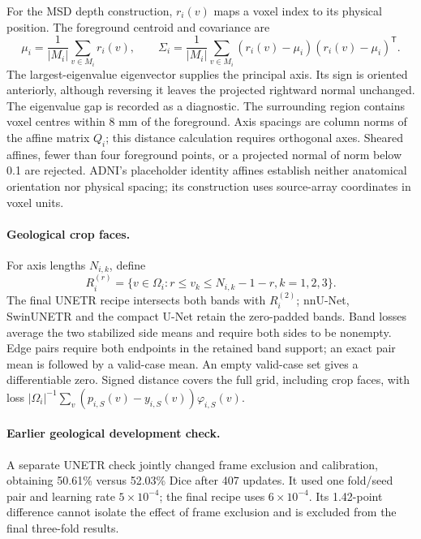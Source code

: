 For the MSD depth construction, $r_i(v)$ maps a voxel index to its
physical position. The foreground centroid and covariance are
\begin{equation}
\mu_i=\frac{1}{|M_i|}\sum_{v\in M_i}r_i(v),\qquad
\Sigma_i=\frac{1}{|M_i|}\sum_{v\in M_i}
(r_i(v)-\mu_i)(r_i(v)-\mu_i)^{\mathsf T}.
\label{eq:depth-centroid-covariance}
\end{equation}
The largest-eigenvalue eigenvector supplies the principal axis. Its
sign is oriented anteriorly, although reversing it leaves the projected
rightward normal unchanged. The eigenvalue gap is recorded as a
diagnostic. The surrounding region contains voxel centres within
8 mm of the foreground. Axis spacings are column norms of the affine
matrix $Q_i$; this distance calculation requires orthogonal axes.
Sheared affines, fewer than four foreground points, or a projected
normal of norm below 0.1 are rejected. ADNI's placeholder identity
affines establish neither anatomical orientation nor physical spacing;
its construction uses source-array coordinates in voxel units.

\paragraph{Geological crop faces.}\label{sec:geo-boundaries}
For axis lengths $N_{i,k}$, define
\begin{equation}
R_i^{(r)}=\{v\in\Omega_i:r\leq v_k\leq N_{i,k}-1-r, k=1,2,3\}.
\label{eq:geological-band-frame}
\end{equation}
The final UNETR recipe intersects both bands with $R_i^{(2)}$;
nnU-Net, SwinUNETR and the compact U-Net retain the zero-padded bands.
Band losses average the two stabilized side means and require both
sides to be nonempty. Edge pairs require both endpoints in the retained
band support; an exact pair mean is followed by a valid-case mean.
An empty valid-case set gives a differentiable zero. Signed distance
covers the full grid, including crop faces, with loss
$|\Omega_i|^{-1}\sum_v(p_{i,S}(v)-y_{i,S}(v))\varphi_{i,S}(v)$.

\paragraph{Earlier geological development check.}\label{sec:geo-development}
A separate UNETR check jointly changed frame exclusion and calibration,
obtaining 50.61\% versus 52.03\% Dice after 407
updates. It used one fold/seed pair and learning rate $5\times10^{-4}$;
the final recipe uses $6\times10^{-4}$. Its 1.42-point difference
cannot isolate the effect of frame exclusion and is excluded from the
final three-fold results.

